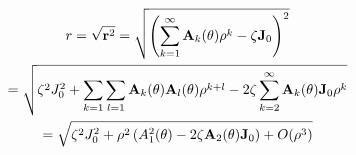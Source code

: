 \documentclass{article}
\begin{document}
\begin{multline}
	r = \sqrt{{\bf r}^2}
	=
	\sqrt{
		\left(
			\sum_{k=1}^{\infty} {\bf A}_k(\theta) \rho^k - \zeta {\bf J}_0
		\right)^2
	}
	\\
	=
	\sqrt{
		\zeta^2 J_0^2 + \sum_{k=1}\sum_{l=1} {\bf A}_k(\theta) {\bf A}_l(\theta) \rho^{k+l}
		-2\zeta\sum_{k=2}^{\infty} {\bf A}_k(\theta) {\bf J}_0 \rho^k
	}
	\\
	=
	\sqrt{
		\zeta^2 J_0^2 + \rho^2 \left(A_1^2(\theta) - 2\zeta {\bf A}_2(\theta) {\bf J}_0\right) + O(\rho^3)
	}
\end{multline}
\end{document}
